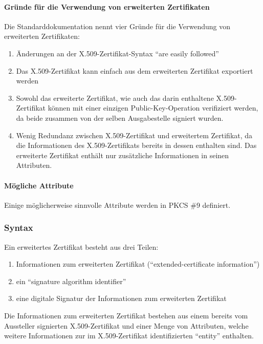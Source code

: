 \documentclass[10pt,a4paper]{article}
\begin{document}
\paragraph{Gründe für die Verwendung von erweiterten Zertifikaten}
Die Standarddokumentation nennt vier Gründe für die Verwendung von erweiterten
Zertifikaten:
\begin{enumerate}
    \item Änderungen an der X.509-Zertifikat-Syntax "`are easily followed"'
    \item Das X.509-Zertifikat kann einfach aus dem erweiterten Zertifikat exportiert
        werden
    \item Sowohl das erweiterte Zertifikat, wie auch das darin enthaltene X.509-Zertifikat
        können mit einer einzigen Public-Key-Operation verifiziert werden, da beide
        zusammen von der selben Ausgabestelle signiert wurden.
    \item Wenig Redundanz zwischen X.509-Zertifikat und erweitertem Zertifikat, da die
        Informationen des X.509-Zertifikats bereits in dessen enthalten sind. Das
        erweiterte Zertifikat enthält nur zusätzliche Informationen in seinen Attributen.
\end{enumerate}

\paragraph{Mögliche Attribute}
Einige möglicherweise sinnvolle Attribute werden in PKCS \#9 definiert.

\subsubsection{Syntax}
Ein erweitertes Zertifikat besteht aus drei Teilen:
\begin{enumerate}
    \item Informationen zum erweiterten Zertifikat ("`extended-certificate information"')
    \item ein "`signature algorithm identifier"'
    \item eine digitale Signatur der Informationen zum erweiterten Zertifikat
\end{enumerate}

Die Informationen zum erweiterten Zertifikat bestehen aus einem bereits vom Aussteller
signierten X.509-Zertifikat und einer Menge von Attributen, welche weitere Informationen
zur im X.509-Zertifikat identifizierten "`entity"' enthalten.
\end{document}
